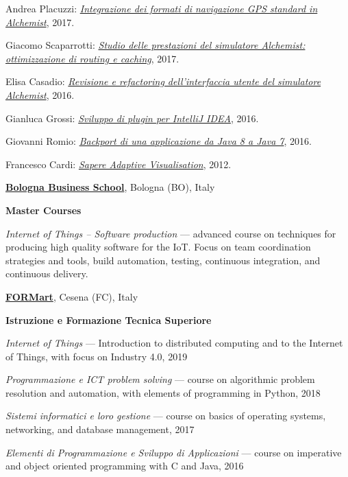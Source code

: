 \begin{outerlist}
\begin{innerlist}
      \item Andrea Placuzzi: \href{http://amslaurea.unibo.it/14329/}{\textit{Integrazione dei formati di navigazione GPS standard in Alchemist}}, 2017.
      \item Giacomo Scaparrotti: \href{http://amslaurea.unibo.it/14019/}{\textit{Studio delle prestazioni del simulatore Alchemist: ottimizzazione di routing e caching}}, 2017.
      \item Elisa Casadio: \href{http://amslaurea.unibo.it/12310/}{\textit{Revisione e refactoring dell'interfaccia utente del simulatore Alchemist}}, 2016.
      \item Gianluca Grossi: \href{http://amslaurea.unibo.it/12503/}{\textit{Sviluppo di plugin per IntelliJ IDEA}}, 2016.
      \item Giovanni Romio: \href{http://amslaurea.unibo.it/10481/}{\textit{Backport di una applicazione da Java 8 a Java 7}}, 2016.
      \item Francesco Cardi: \href{http://archive.fo/zMGo8}{\textit{Sapere Adaptive Visualisation}}, 2012.
    \end{innerlist}
\end{outerlist}
\halfblankline

\href{https://www.bbs.unibo.eu/hp/}{\textbf{Bologna Business School}}, Bologna (BO), Italy
\begin{outerlist}
\item[] \textbf{Master Courses} %
    \begin{innerlist}
        \item \textit{Internet of Things -- Software production} --- advanced course on techniques for producing high quality software for the IoT. Focus on team coordination strategies and tools, build automation, testing, continuous integration, and continuous delivery.
\end{innerlist}
\halfblankline
\end{outerlist}

\href{http://www.formart.it/}{\textbf{FORMart}}, Cesena (FC), Italy
\begin{outerlist}
\item[] \textbf{Istruzione e Formazione Tecnica Superiore}
    \begin{innerlist}
        \item \textit{Internet of Things} --- Introduction to distributed computing and to the Internet of Things, with focus on Industry 4.0, 2019
        \item \textit{Programmazione e ICT problem solving} --- course on algorithmic problem resolution and automation, with elements of programming in Python, 2018
        \item \textit{Sistemi informatici e loro gestione} --- course on basics of operating systems, networking, and database management, 2017
        \item \textit{Elementi di Programmazione e Sviluppo di Applicazioni} --- course on imperative and object oriented programming with C and Java, 2016
    \end{innerlist}
\halfblankline
\end{outerlist}
